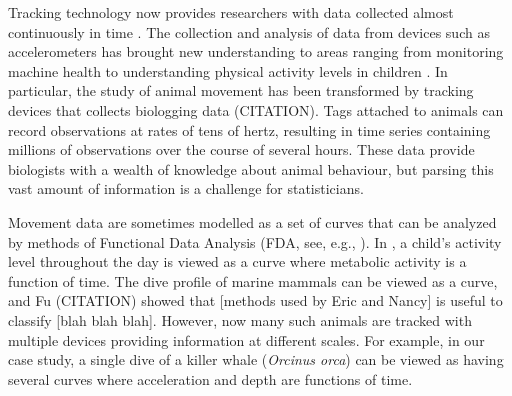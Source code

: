 Tracking technology now provides researchers with data collected almost continuously in time \citep{Hooten:2017}.
The collection and analysis of data from devices such as accelerometers has brought new understanding to areas ranging from monitoring machine health \citep{Getman:2009} to understanding physical activity levels in children \citep{Morris:2007}. In particular, the study of animal movement has been transformed by tracking devices that collects biologging data (CITATION). Tags attached to animals can record observations at rates of tens of hertz, resulting in time series containing millions of observations over the course of several hours. These data provide biologists with a wealth of knowledge about animal behaviour, but parsing this vast amount of information is a challenge for statisticians.


Movement data are sometimes modelled as a set of curves that can be analyzed by methods of Functional Data Analysis (FDA, see, e.g., \citealt{Ramsay:2005}). In \cite{Morris:2007}, a child's activity level throughout the day is viewed as a curve where metabolic activity is a function of time. The dive profile of marine mammals can be viewed as a curve, and Fu (CITATION) showed that [methods used by Eric and Nancy] is useful to classify [blah blah blah]. However, now many such animals are tracked with multiple devices providing information at different scales. For example, in our case study, a single dive of a killer whale (\textit{Orcinus orca}) can be viewed as having several curves where acceleration and depth are functions of time.

